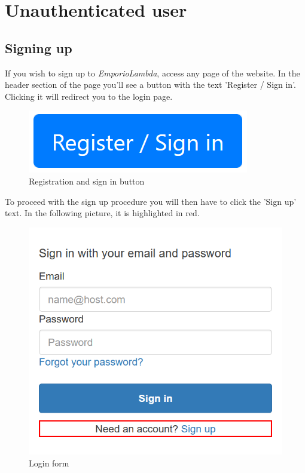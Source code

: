 \section{Unauthenticated user}
\subsection{Signing up}
If you wish to sign up to \textit{EmporioLambda}, access any page of the website. In the header section of the page you'll see a button with the text 'Register / Sign in'. Clicking it will redirect you to the login page.

\begin{figure}[H]
\centering
\includegraphics[scale=0.6]{res/Immagini/RegisterSigninButton}
\caption{Registration and sign in button}
\end{figure}

To proceed with the sign up procedure you will then have to click the 'Sign up' text. In the following picture, it is highlighted in red.

\begin{figure}[H]
\centering
\includegraphics[scale=0.6]{res/Immagini/RegisterSigninForm}
\caption{Login form}
\end{figure}

